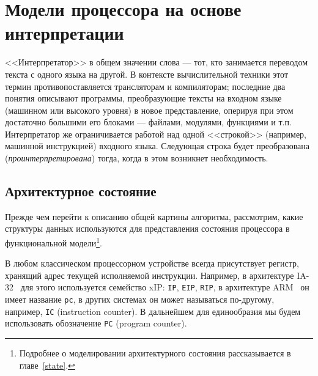 \chapter{Модели процессора на основе интерпретации}\label{interpretation}



<<Интерпретатор>> в общем значении слова --- тот, кто занимается переводом текста с одного языка на другой. В контексте вычислительной техники этот термин противопоставляется трансляторам и компиляторам; последние два понятия описывают программы, преобразующие тексты на входном языке (машинном или высокого уровня) в новое представление, оперируя при этом достаточно большими его блоками --- файлами, модулями, функциями и т.п. Интерпретатор же ограничивается работой над одной <<строкой>> (например, машинной инструкцией) входного языка. Следующая строка будет преобразована (\emph{проинтерпретирована}) тогда, когда в этом возникнет необходимость.

\section{Архитектурное состояние}

Прежде чем перейти к описанию общей картины алгоритма, рассмотрим, какие структуры данных используются для представления состояния процессора в функциональной модели\footnote{Подробнее о моделировании архитектурного состояния рассказывается в главе~\ref{state}.}.

В любом классическом процессорном устройстве всегда присутствует регистр, хранящий адрес текущей исполняемой инструкции. Например, в архитектуре IA-32~\cite{intelmanual2a} для этого используется семейство xIP: \texttt{IP}, \texttt{EIP}, \texttt{RIP}, в архитектуре ARM~\cite{arm-sdg} он имеет название \texttt{pc}, в других системах он может называться по-другому, например, \texttt{IC} (\abbr instruction counter). В дальнейшем для единообразия мы будем использовать обозначение \texttt{PC} (\abbr program counter).

